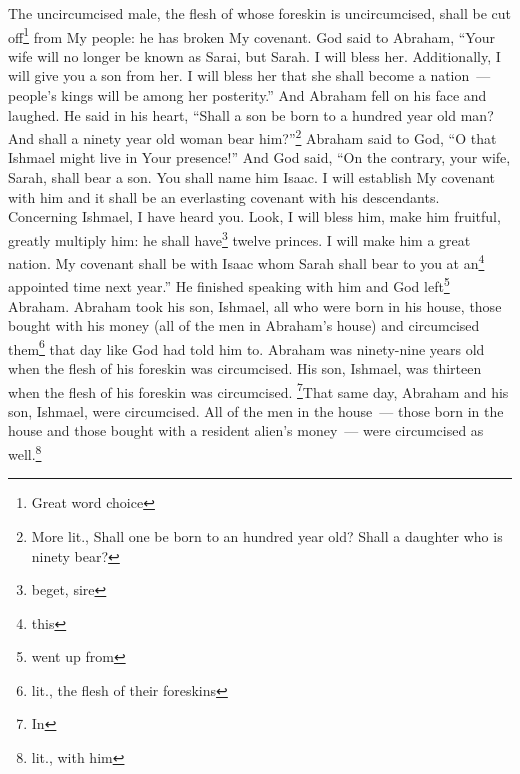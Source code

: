\begin{enumerate}[align=center]
     The uncircumcised male, the flesh of whose foreskin is uncircumcised, shall be cut off\footnote{Great word choice} from My people: he has broken My covenant.%
     God said to Abraham, ``Your wife will no longer be known as Sarai, but Sarah.%
     I will bless her. Additionally, I will give you a son from her. I will bless her that she shall become a nation~--- people's kings will be among her posterity.''%
     And Abraham fell on his face and laughed. He said in his heart, ``Shall a son be born to a hundred year old man? And shall a ninety year old woman bear him?''\footnote{More lit., Shall one be born to an hundred year old? Shall a daughter who is ninety bear?}%
     Abraham said to God, ``O that Ishmael might live in Your presence!''%
     And God said, ``On the contrary, your wife, Sarah, shall bear a son. You shall name him Isaac. I will establish My covenant with him and it shall be an everlasting covenant with his descendants.%
     Concerning Ishmael, I have heard you. Look, I will bless him, make him fruitful, greatly multiply him: he shall have\footnote{beget, sire} twelve princes. I will make him a great nation.%
     My covenant shall be with Isaac whom Sarah shall bear to you at an\footnote{this} appointed time next year.''%
     He finished speaking with him and God left\footnote{went up from} Abraham.%
     Abraham took his son, Ishmael, all who were born in his house, those bought with his money (all of the men in Abraham's house) and circumcised them\footnote{lit., the flesh of their foreskins} that day like God had told him to.%
     Abraham was ninety-nine years old when the flesh of his foreskin was circumcised.%
     His son, Ishmael, was thirteen when the flesh of his foreskin was circumcised.%
     \footnote{In}That same day, Abraham and his son, Ishmael, were circumcised.%
     All of the men in the house~--- those born in the house and those bought with a resident alien's money~--- were circumcised as well.\footnote{lit., with him}%
\end{enumerate}
